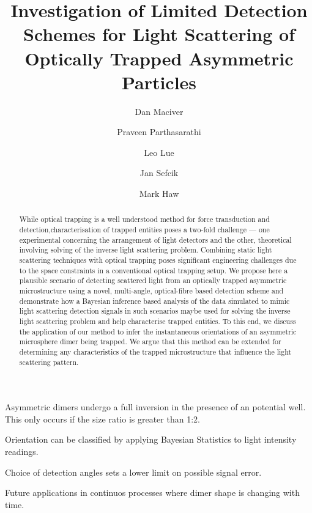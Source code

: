 \documentclass[final, 3p]{elsarticle}
\begin{document}
\begin{frontmatter}

\title{Investigation of Limited Detection Schemes for Light Scattering of Optically Trapped Asymmetric Particles}


\author[aff1]{Dan Maciver} 

\author[aff1]{Praveen Parthasarathi}

\author[aff1]{Leo Lue}

\author[aff1]{Jan Sefcik}

\author[aff1]{Mark Haw}






\begin{abstract}
  While optical trapping is a well understood method for force
  transduction and detection,characterisation of trapped entities
  poses a two-fold challenge --- one experimental concerning the
  arrangement of light detectors and the other, theoretical involving
  solving of the inverse light scattering problem. Combining static
  light scattering techniques with optical trapping poses significant
  engineering challenges due to the space constraints in a
  conventional optical trapping setup.  We propose here a plausible
  scenario of detecting scattered light from an optically trapped
  asymmetric microstructure using a novel, multi-angle, optical-fibre
  based detection scheme and demonstrate how a Bayesian inference
  based analysis of the data simulated to mimic light scattering
  detection signals in such scenarios maybe used for solving the
  inverse light scattering problem and help characterise trapped
  entities.  To this end, we discuss the application of our method to
  infer the instantaneous orientations of an asymmetric microsphere
  dimer being trapped. We argue that this method can be extended for
  determining any characteristics of the trapped microstructure that
  influence the light scattering pattern.
\end{abstract}

\begin{highlights}
\item Asymmetric dimers undergo a full inversion in the presence of an potential well. This only occurs if the size ratio is greater than 1:2.  
\item Orientation can be classified by applying Bayesian Statistics to light intensity readings. 
\item Choice of detection angles sets a lower limit on possible signal error. 
\item Future applications in continuos processes where dimer shape is changing with time.   
\end{highlights}


\end{frontmatter}
\end{document}
